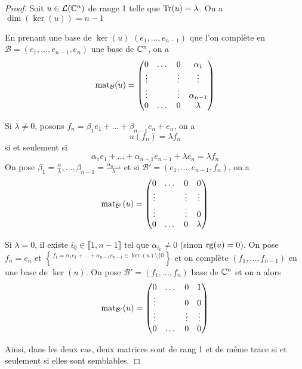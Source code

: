 \begin{proof}
    Soit $u\in\mathcal{L}(\mathbb{C}^{n})$ de range 1 telle que $\operatorname{Tr}(u)=\lambda$. On a $\dim(\ker(u))=n-1$

    En prenant une base de $\ker(u)$ $(e_{1},\dots,e_{n-1})$ que l'on complète en $\mathcal{B}=(e_{1},\dots,e_{n-1},e_{n})$ une base de $\mathbb{C}^{n}$, on a 
    \begin{equation}
        \operatorname{mat}_{\mathcal{B}}(u)
        =
        \begin{pmatrix}
            0 & \dots & 0 & \alpha_{1}\\
            \vdots & & \vdots &\vdots\\
            \vdots & & \vdots &\alpha_{n-1}\\
            0 & \dots & 0& \lambda
        \end{pmatrix}
    \end{equation}

    Si $\lambda\neq0$, posons $f_{n}=\beta_{1}e_{1}+\dots+\beta_{n-1}e_{n}+e_{n}$, on a 
    \begin{equation}
        u(f_{n})=\lambda f_{n}
    \end{equation}
    si et seulement si
    \begin{equation}
        \alpha_{1}e_{1}+\dots+\alpha_{n-1}e_{n-1}+\lambda e_{n}=\lambda f_{n}
    \end{equation}
    On pose $\beta_{1}=\frac{\alpha}{\lambda},\dots,\beta_{n-1}=\frac{\alpha_{n-1}}{\lambda}$ et si $\mathcal{B}'=(e_{1},\dots,e_{n-1},f_{n})$, on a 
    \begin{equation}
        \operatorname{mat}_{\mathcal{B}'}(u)=
        \begin{pmatrix}
            0 & \dots & 0 & 0\\
            \vdots & & \vdots &\vdots\\
            \vdots & & \vdots &0\\
            0 & \dots & 0& \lambda
        \end{pmatrix}
    \end{equation}

    Si $\lambda=0$, il existe $i_{0}\in\llbracket 1,n-1\rrbracket$ tel que $\alpha_{i_{0}}\neq0$ (sinon $\operatorname{rg}(u)=0$). On pose $f_{n}=e_{n}$ et $f_{1}=\alpha_{1}e_{1}+\dots+\alpha_{n-1}e_{n-1}\in\ker(u)\setminus\lbrace0\brace$ et on complète $(f_{1},\dots,f_{n-1})$ en une base de $\ker(u)$. On pose $\mathcal{B}'=(f_{1},\dots,f_{n})$ base de $\mathbb{C}^{n}$ et on a alors 
    \begin{equation}
        \operatorname{mat}_{\mathcal{B}'}(u)=
        \begin{pmatrix}
            0 & \dots & 0 & 1\\
            \vdots & & 0 &0\\
            \vdots & & \vdots &\vdots\\
            0 & \dots & 0& 0
        \end{pmatrix}
    \end{equation}

    Ainsi, dans les deux cas, deux matrices sont de rang 1 et de même trace si et seulement si elles sont semblables.
\end{proof}

